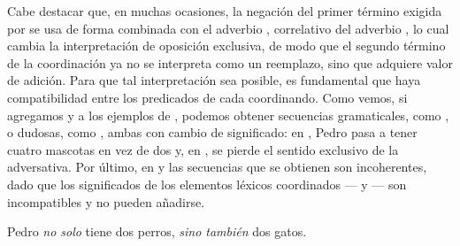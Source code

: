 Cabe destacar que, en muchas ocasiones, la negación del primer término exigida
por  se usa de forma combinada con el adverbio ,
correlativo del adverbio , lo cual cambia la interpretación de
oposición exclusiva, de modo que el segundo término de la coordinación ya no se
interpreta como un reemplazo, sino que adquiere valor de adición. Para que tal
interpretación sea posible, es fundamental que haya compatibilidad entre los
predicados de cada coordinando. Como vemos, si agregamos  y
 a los ejemplos de , podemos obtener secuencias
gramaticales, como , o dudosas, como ,
ambas con cambio de significado: en , Pedro pasa a tener
cuatro mascotas en vez de dos y, en , se pierde el sentido
exclusivo de la adversativa. Por último, en  y
 las secuencias que se obtienen son incoherentes, dado que
los significados de los elementos léxicos coordinados --- y
--- son incompatibles y no pueden añadirse.

\begin{exe}
  \ex
    \begin{xlist}
      \ex\label{ex:12-solo-b} Pedro \textit{no solo} tiene dos perros,
          \textit{sino también} dos gatos.
    \end{xlist}
\end{exe}

